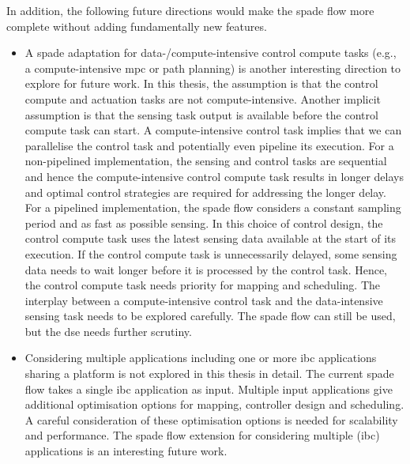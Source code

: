 In addition, the  following future directions would make the \gls{spade} flow more complete without adding fundamentally new features.
\begin{itemize}
    \item A \gls{spade} adaptation for data-/compute-intensive control compute tasks (e.g., a compute-intensive \gls{mpc} or path planning) is another interesting direction to explore for future work. In this thesis, the assumption is that the control compute and actuation tasks are not compute-intensive. Another implicit assumption is that the sensing task output is available before the control compute task can start. A compute-intensive control task implies that we can parallelise the control task and potentially even pipeline its execution. 
    For a non-pipelined implementation, the sensing and control tasks are sequential and hence the compute-intensive control compute task results in longer delays and optimal control strategies are required for addressing the longer delay.
    For a pipelined implementation, the \gls{spade} flow considers a constant sampling period and as fast as possible sensing. In this choice of control design, the control compute task uses the latest sensing data available at the start of its execution. If the control compute task is unnecessarily delayed, some sensing data needs to wait longer before it is processed by the control task. Hence, the control compute task needs priority for mapping and scheduling.  
    The interplay between a compute-intensive control task and the data-intensive sensing task needs to be explored carefully. 
    The \gls{spade} flow can still be used, but the \gls{dse} needs further scrutiny.
    
    \item Considering multiple applications including one or more \gls{ibc} applications sharing a platform is not explored in this thesis in detail. The current \gls{spade} flow takes a single \gls{ibc} application as input. Multiple input applications give additional optimisation options for mapping, controller design and scheduling. A careful consideration of these optimisation options is needed for scalability and performance.
    The \gls{spade} flow extension for considering multiple (\gls{ibc}) applications is an interesting future work.
    

\end{itemize}
